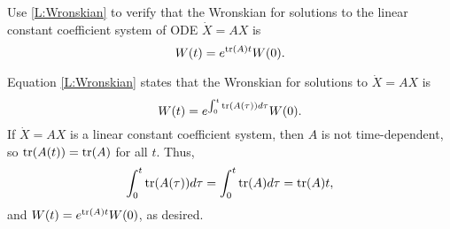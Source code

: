 \documentclass{ximera}
\begin{document}
\begin{exercise}  \label{c14.w.2}
Use \eqref{L:Wronskian} to verify that the Wronskian for solutions to the linear 
constant coefficient system of ODE $\dot{X}=AX$ is
\begin{equation}  \label{E:ccw}
W(t) = e^{{\rm tr}(A)t}W(0).
\end{equation}

\begin{solution}
Equation \eqref{L:Wronskian}
states that the Wronskian for solutions to $\dot{X} = AX$ is
\[
W(t) = e^{\int_0^t{\rm tr}(A(\tau))d\tau}W(0).
\]
If $\dot{X} = AX$ is a linear constant coefficient system, then $A$ is not
time-dependent, so ${\rm tr}(A(t)) = {\rm tr}(A)$ for all $t$.  Thus,
\[
\int_0^t{\rm tr}(A(\tau))d\tau = \int_0^t{\rm tr}(A)d\tau = {\rm tr}(A)t,
\]
and $W(t) = e^{{\rm tr}(A)t}W(0)$, as desired.

\end{solution}
\end{exercise}
\end{document}
